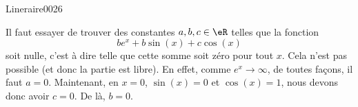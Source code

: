 \begin{corrige}{Lineraire0026}

	Il faut essayer de trouver des constantes $a,b,c\in\eR$ telles que la fonction 
	\begin{equation}
		b e^{x}+b\sin(x)+c\cos(x)
	\end{equation}
	soit nulle, c'est à dire telle que cette somme soit zéro pour tout $x$. Cela n'est pas possible (et donc la partie est libre). En effet, comme $ e^{x}\to\infty$, de toutes façons, il faut $a=0$. Maintenant, en $x=0$, $\sin(x)=0$ et $\cos(x)=1$, nous devons donc avoir $c=0$. De là, $b=0$.

\end{corrige}
